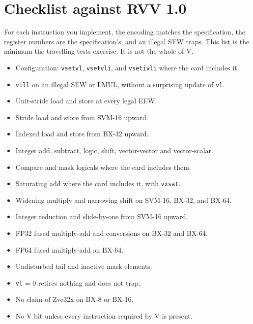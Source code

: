 \chapter{Checklist against RVV 1.0}

For each instruction you implement, the encoding matches the specification, the register numbers are the specification's, and an illegal SEW traps. This list is the minimum the travelling tests exercise. It is not the whole of V.

\begin{itemize}[leftmargin=1.5em]
  \item Configuration: \texttt{vsetvl}, \texttt{vsetvli}, and \texttt{vsetivli} where the card includes it.
  \item \texttt{vill} on an illegal SEW or LMUL, without a surprising update of \texttt{vl}.
  \item Unit-stride load and store at every legal EEW.
  \item Stride load and store from SVM-16 upward.
  \item Indexed load and store from BX-32 upward.
  \item Integer add, subtract, logic, shift, vector-vector and vector-scalar.
  \item Compare and mask logicals where the card includes them.
  \item Saturating add where the card includes it, with \texttt{vxsat}.
  \item Widening multiply and narrowing shift on SVM-16, BX-32, and BX-64.
  \item Integer reduction and slide-by-one from SVM-16 upward.
  \item FP32 fused multiply-add and conversions on BX-32 and BX-64.
  \item FP64 fused multiply-add on BX-64.
  \item Undisturbed tail and inactive mask elements.
  \item \texttt{vl} = 0 retires nothing and does not trap.
  \item No claim of Zve32x on BX-8 or BX-16.
  \item No V bit unless every instruction required by V is present.
\end{itemize}
